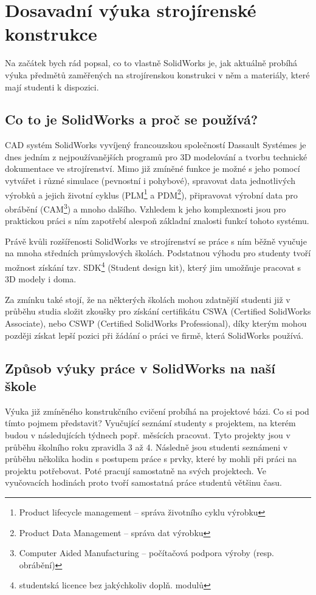 \chapter{Dosavadní výuka strojírenské konstrukce}
Na začátek bych rád popsal, co to vlastně SolidWorks je, jak aktuálně probíhá výuka předmětů zaměřených na strojírenskou konstrukci v něm a materiály, které mají studenti k dispozici.

\section{Co to je SolidWorks a proč se používá?}
    CAD systém SolidWorks vyvíjený francouzskou společností Dassault Systémes je dnes jedním z nejpoužívanějších programů pro 3D modelování a tvorbu technické dokumentace ve strojírenství.
    Mimo již zmíněné funkce je možné s jeho pomocí vytvářet i různé simulace (pevnostní i pohybové), spravovat data jednotlivých výrobků a jejich životní cyklus (PLM\footnote{Product lifecycle management -- správa životního cyklu výrobku} a PDM\footnote{Product Data Management -- správa dat výrobku}), připravovat výrobní data pro obrábění (CAM\footnote{Computer Aided Manufacturing -- počítačová podpora výroby (resp. obrábění)}) a mnoho dalšího.
    Vzhledem k jeho komplexnosti jsou pro praktickou práci s ním zapotřebí alespoň základní znalosti funkcí tohoto systému.

    Právě kvůli rozšířenosti SolidWorks ve strojírenství se práce s ním běžně vyučuje na mnoha středních průmyslových školách.
    Podstatnou výhodu pro studenty tvoří možnost získání tzv. SDK\footnote{studentská licence bez jakýchkoliv doplň. modulů} (Student design kit), který jim umožňuje pracovat s 3D modely i doma.

    Za zmínku také stojí, že na některých školách mohou zdatnější studenti již v průběhu studia složit zkoušky pro získání certifikátu CSWA (Certified SolidWorks Associate), nebo CSWP (Certified SolidWorks Professional), díky kterým mohou později získat lepší pozici při žádání o práci ve firmě, která SolidWorks používá.

\section{Způsob výuky práce v SolidWorks na naší škole}
    Výuka již zmíněného konstrukčního cvičení probíhá na projektové bázi.
    Co si pod tímto pojmem představit?
    Vyučující seznámí studenty s projektem, na kterém budou v následujících týdnech popř. měsících pracovat. 
    Tyto projekty jsou v průběhu školního roku zpravidla 3 až 4.
    Následně jsou studenti seznámeni v průběhu několika hodin s postupem práce s prvky, které by mohli při práci na projektu potřebovat.
    Poté pracují samostatně na svých projektech.
    Ve vyučovacích hodinách proto tvoří samostatná práce studentů většinu času.

